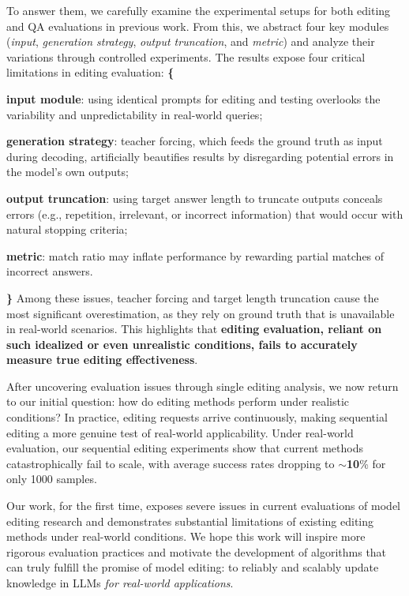 To answer them, we carefully examine the experimental setups for both editing and QA evaluations in previous work.
From this, we abstract four key modules (\textit{input}, \textit{generation strategy}, \textit{output truncation}, and \textit{metric}) and analyze their variations through controlled experiments. 
The results expose four critical limitations in editing evaluation:
{\textbf{\{}}\begin{enumerate*} %
\item[\textcolor{black}{\ding{182}}] \textbf{input module}: using identical prompts for editing and testing overlooks the variability and unpredictability in real-world queries;
\item[\textcolor{black}{\ding{183}}] \textbf{generation strategy}: teacher forcing, which feeds the ground truth as input during decoding, artificially beautifies results by disregarding potential errors in the model’s own outputs;
\item[\textcolor{black}{\ding{184}}] \textbf{output truncation}: using target answer length to truncate outputs conceals errors (e.g., repetition, irrelevant, or incorrect information) that would occur with natural stopping criteria;
\item[\textcolor{black}{\ding{185}}] \textbf{metric}: match ratio may inflate performance by rewarding partial matches of incorrect answers.
\end{enumerate*}{\textbf{\}}}
Among these issues, teacher forcing and target length truncation cause the most significant overestimation, as they rely on ground truth that is unavailable in real-world scenarios.
This highlights that \textbf{editing evaluation, reliant on such idealized or even unrealistic conditions, fails to accurately measure true editing effectiveness}.


After uncovering evaluation issues through single editing analysis, we now return to our initial question: how do editing methods perform under realistic conditions? 
In practice, editing requests arrive continuously, making sequential editing a more genuine test of real-world applicability.
Under real-world evaluation, our sequential editing experiments show that current methods catastrophically fail to scale, with average success rates dropping to $\sim$\textbf{10}\% for only 1000 samples. 


Our work, for the first time, exposes severe issues in current evaluations of model editing research and demonstrates substantial limitations of existing editing methods under real-world conditions. 
We hope this work will inspire more rigorous evaluation practices and motivate the development of algorithms that can truly fulfill the promise of model editing: to reliably and scalably update knowledge in LLMs \textit{for real-world applications}.

